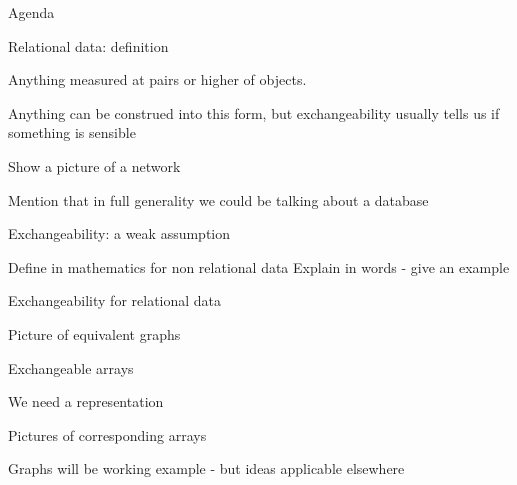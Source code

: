 

\begin{frame}
  \begin{block}{}
    \titlepage
  \end{block}
\end{frame}

\begin{frame}{Agenda}
  \begin{block}{}
  \end{block}
\end{frame}

\begin{frame}{Relational data: definition}
  \begin{block}{}
    Anything measured at pairs or higher of objects.
    
    Anything can be construed into this form, but exchangeability usually tells us if something is sensible
    
    Show a picture of a network
    
    Mention that in full generality we could be talking about a database
  \end{block}
\end{frame}

\begin{frame}{Exchangeability: a weak assumption}
  \begin{block}{}
    Define in mathematics for non relational data
    Explain in words - give an example
  \end{block}
\end{frame}

\begin{frame}{Exchangeability for relational data}
  \begin{block}{}
    Picture of equivalent graphs
  \end{block}
\end{frame}

\begin{frame}{Exchangeable arrays}
  \begin{block}{}
    We need a representation
  
    Pictures of corresponding arrays
    
    Graphs will be working example - but ideas applicable elsewhere
  \end{block}
\end{frame}

